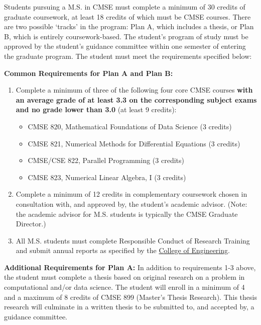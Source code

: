 Students pursuing a M.S. in CMSE must complete a minimum of 30 credits
of graduate coursework, at least 18 credits of which must be CMSE
courses. There are two possible `tracks' in the program: Plan A, which
includes a thesis, or Plan B, which is entirely coursework-based. The
student's program of study must be approved by the student's guidance
committee within one semester of entering the graduate program. The
student must meet the requirements specified below:

\vspace{3mm}
\noindent
\textbf{Common Requirements for Plan A and Plan B:}

\begin{enumerate}

\item Complete a minimum of three of the following four core CMSE
  courses \textbf{with an average grade of at least 3.3 on the
    corresponding subject exams and no grade lower than 3.0} (at least
  9 credits):

\begin{itemize}
    \item  CMSE 820, Mathematical Foundations of Data Science (3 credits)  
    \item  CMSE 821, Numerical Methods for Differential Equations (3 credits)  
    \item  CMSE/CSE 822, Parallel Programming (3 credits)  
    \item  CMSE 823, Numerical Linear Algebra, I (3 credits)  
\end{itemize}

\item Complete a minimum of 12 credits in complementary coursework
  chosen in consultation with, and approved by, the student's academic
  advisor.  (Note: the academic advisor for M.S. students is typically the CMSE Graduate Director.)
 
\item All M.S. students must complete Responsible Conduct of Research
  Training and submit annual reports as specified by the
  \href{https://www.egr.msu.edu/academics/graduate/rcr}{College of
    Engineering}.

\end{enumerate}

\vspace{3mm}
\noindent
\textbf{Additional Requirements for Plan A:} In addition to
requirements 1-3 above, the student must complete a thesis based on
original research on a problem in computational and/or data
science. The student will enroll in a minimum of 4 and a maximum of 8
credits of CMSE 899 (Master's Thesis Research). This thesis research
will culminate in a written thesis to be submitted to, and accepted
by, a guidance committee. 

